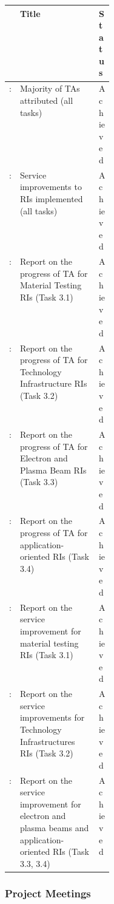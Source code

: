 {\fontsize{9}{11}\selectfont
\noindent
  \begin{tabularx}{\linewidth}{!{\color{mygray}\vrule}p{0.10\linewidth}!
  {\color{mygray}\vrule}X!
  {\color{mygray}\vrule}p{0.10\linewidth}!{\color{mygray}\vrule} } \hline
     & {\bf Title} & {\bf Status} \\ \hline

    : & Majority of TAs attributed (all tasks) & Achieved \\
    : & Service improvements to RIs implemented (all tasks) & Achieved \\ \hline
    : & Report on the progress of TA for Material Testing RIs (Task 3.1) &  Achieved \\ 
    : & Report on the progress of TA for Technology Infrastructure RIs (Task 3.2)  &  Achieved \\
    : & Report on the progress of TA for Electron and Plasma Beam RIs (Task 3.3)  &  Achieved \\
    : & Report on the progress of TA for application-oriented RIs (Task 3.4)  &  Achieved \\ \hline
    
    : & Report on the service improvement for material testing RIs (Task 3.1) &  Achieved \\
    : & Report on the service improvements for Technology Infrastructures RIs (Task 3.2)  &  Achieved \\
    : & Report on the service improvement for electron and plasma beams and application-oriented RIs (Task 3.3, 3.4)  &  Achieved \\ \hline
  \end{tabularx}
}

\subsubsection*{Project Meetings}

